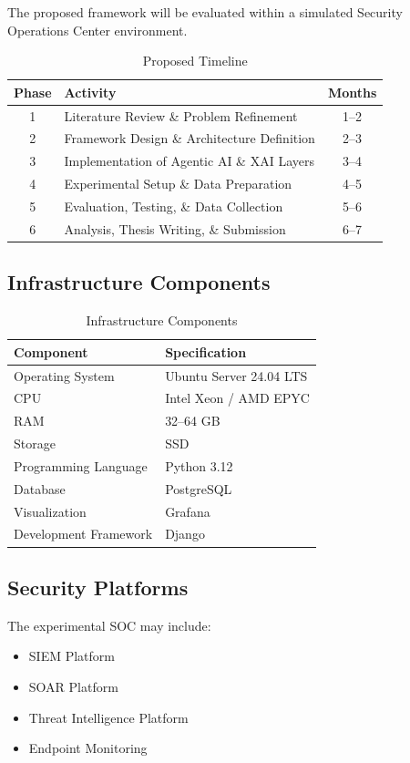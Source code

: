 \documentclass[12pt,a4paper]{report}
\begin{document}
The proposed framework will be evaluated within a simulated Security Operations Center environment.

\begin{table}[h!]
\centering
\caption{Proposed Timeline}
\label{tab:timeline}
\begin{tabularx}{\textwidth}{|c|X|c|}
\hline
\textbf{Phase} & \textbf{Activity} & \textbf{Months} \\
\hline
1 & Literature Review \& Problem Refinement & 1--2 \\
\hline
2 & Framework Design \& Architecture Definition & 2--3 \\
\hline
3 & Implementation of Agentic AI \& XAI Layers & 3--4 \\
\hline
4 & Experimental Setup \& Data Preparation & 4--5 \\
\hline
5 & Evaluation, Testing, \& Data Collection & 5--6 \\
\hline
6 & Analysis, Thesis Writing, \& Submission & 6--7 \\
\hline
\end{tabularx}
\end{table}

\subsection{Infrastructure Components}

\begin{table}[h!]
\centering
\caption{Infrastructure Components}
\label{tab:infrastructure}
\begin{tabularx}{\textwidth}{|l|X|}
\hline
\textbf{Component} & \textbf{Specification} \\
\hline
Operating System & Ubuntu Server 24.04 LTS \\
\hline
CPU & Intel Xeon / AMD EPYC \\
\hline
RAM & 32--64 GB \\
\hline
Storage & SSD \\
\hline
Programming Language & Python 3.12 \\
\hline
Database & PostgreSQL \\
\hline
Visualization & Grafana \\
\hline
Development Framework & Django \\
\hline
\end{tabularx}
\end{table}

\subsection{Security Platforms}
The experimental SOC may include:
\begin{itemize}
    \item SIEM Platform
    \item SOAR Platform
    \item Threat Intelligence Platform
    \item Endpoint Monitoring
\end{itemize}
\end{document}
